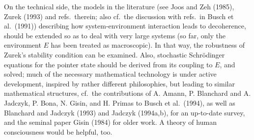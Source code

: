 On the technical side, the models in the literature (see Joos and Zeh (1985),
Zurek (1993) and refs.\
therein; also cf.\ the discussion with refs.\ in   Busch et al.\ (1991))
describing how
system-environment interaction leads to decoherence, should be extended so as
to deal with very large
systems (so far, only the environment $E$ has been treated as macroscopic). In
that way, the
robustness of Zurek's stability condition can be examined. Also, stochastic
Schr\"{o}dinger equations
for the pointer state should be derived from its coupling to $E$, and solved;
much of the necessary
mathematical technology is under active development,  inspired by rather
different
philosophies, but leading to similar mathematical structures, cf.\ the
contributions of A. Amann, P.
Blanchard and A. Jadczyk, P. Bona, N. Gisin, and H. Primas to Busch et al.\ (1994), as
well as Blanchard and Jadczyk (1993) and  Jadczyk (1994a,b),
 for an up-to-date survey, and the seminal paper Gisin (1984) for older
work.   A theory
of human consciousness would be helpful, too.



